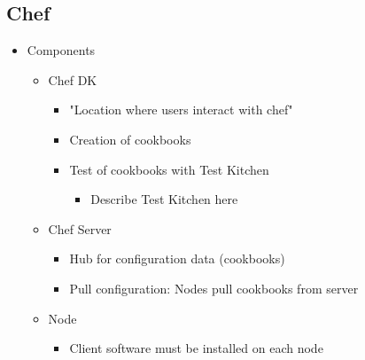 \subsection{Chef}

	\begin{itemize}
		\item Components
		\begin{itemize}
			\item Chef DK
				\begin{itemize}
					\item "Location where users interact with chef"
					\item Creation of cookbooks
					\item Test of cookbooks with Test Kitchen
						\begin{itemize}
							\item Describe Test Kitchen here
						\end{itemize}
				\end{itemize}
			\item Chef Server
				\begin{itemize}
					\item Hub for configuration data (cookbooks)
					\item Pull configuration: Nodes pull cookbooks from server
				\end{itemize}
			\item Node
				\begin{itemize}
					\item Client software must be installed on each node
					
				\end{itemize}
		\end{itemize}
	\end{itemize}

